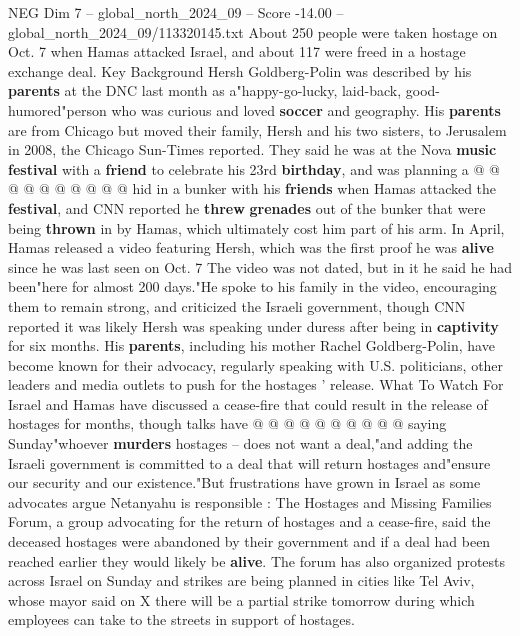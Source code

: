 \begin{textsample}{NEG Dim 7 – global\_north\_2024\_09 – Score -14.00 – global\_north\_2024\_09/113320145.txt}
About 250 people were taken hostage on Oct. 7 when Hamas attacked Israel, and about 117 were freed in a hostage exchange deal.
Key Background Hersh Goldberg-Polin was described by his \textbf{parents} at the DNC last month as a"happy-go-lucky, laid-back, good-humored"person who was curious and loved \textbf{soccer} and geography.
His \textbf{parents} are from Chicago but moved their family, Hersh and his two sisters, to Jerusalem in 2008, the Chicago Sun-Times reported.
They said he was at the Nova \textbf{music} \textbf{festival} with a \textbf{friend} to celebrate his 23rd \textbf{birthday}, and was planning a @ @ @ @ @ @ @ @ @ @ hid in a bunker with his \textbf{friends} when Hamas attacked the \textbf{festival}, and CNN reported he \textbf{threw} \textbf{grenades} out of the bunker that were being \textbf{thrown} in by Hamas, which ultimately cost him part of his arm.
In April, Hamas released a video featuring Hersh, which was the first proof he was \textbf{alive} since he was last seen on Oct. 7 The video was not dated, but in it he said he had been"here for almost 200 days."He spoke to his family in the video, encouraging them to remain strong, and criticized the Israeli government, though CNN reported it was likely Hersh was speaking under duress after being in \textbf{captivity} for six months.
His \textbf{parents}, including his mother Rachel Goldberg-Polin, have become known for their advocacy, regularly speaking with U.S. politicians, other leaders and media outlets to push for the hostages ' release.
What To Watch For Israel and Hamas have discussed a cease-fire that could result in the release of hostages for months, though talks have @ @ @ @ @ @ @ @ @ @ saying Sunday"whoever \textbf{murders} hostages -- does not want a deal,"and adding the Israeli government is committed to a deal that will return hostages and"ensure our security and our existence."But frustrations have grown in Israel as some advocates argue Netanyahu is responsible : The Hostages and Missing Families Forum, a group advocating for the return of hostages and a cease-fire, said the deceased hostages were abandoned by their government and if a deal had been reached earlier they would likely be \textbf{alive}.
The forum has also organized protests across Israel on Sunday and strikes are being planned in cities like Tel Aviv, whose mayor said on X there will be a partial strike tomorrow during which employees can take to the streets in support of hostages.

\end{textsample}
